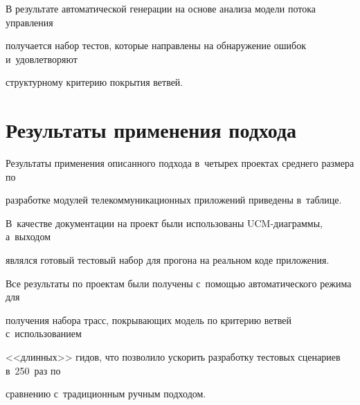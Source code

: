    В результате автоматической генерации на основе анализа модели потока управления


получается набор тестов, которые направлены на обнаружение ошибок и~удовлетворяют


структурному критерию покрытия ветвей.





\section{Результаты применения подхода}





   Результаты применения описанного подхода в~четырех проектах среднего размера по


разработке модулей телекоммуникационных приложений приведены в~таблице.


В~качестве документации на проект были использованы UCM-диа\-грам\-мы, а~выходом


являлся готовый тестовый набор для прогона на реальном коде приложения.





   Все результаты по проектам были получены с~помощью автоматического режима для


получения набора трасс, покрывающих модель по критерию ветвей с~использованием


<<длинных>> гидов, что позволило ускорить разработку тестовых сценариев в~250~раз по


сравнению с~традиционным ручным подходом.





